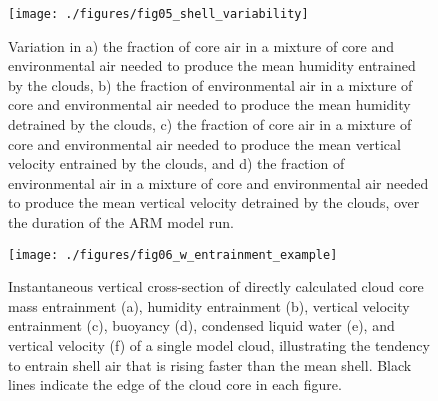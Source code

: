 \documentclass[12pt]{article}
\begin{document}
\begin{figure}[t]
  \noindent\texttt{[image: ./figures/fig05\_shell\_variability]}
  \caption{Variation in a) the fraction of core air in a mixture of core 
  and environmental air needed to produce the mean humidity entrained by 
  the clouds, b) the fraction of environmental air in a mixture of core 
  and environmental air needed to produce the mean humidity detrained by 
  the clouds, c) the fraction of core air in a mixture of core and 
  environmental air needed to produce the mean vertical velocity 
  entrained by the clouds, and d) the fraction of environmental air in 
  a mixture of core and environmental air needed to produce the mean 
  vertical velocity detrained by the clouds, over the duration of the 
  ARM model run.
  }
  \label{fig:shell_variability}
\end{figure}

\begin{figure}[t]
  \noindent\texttt{[image: ./figures/fig06\_w\_entrainment\_example]}
  \caption{Instantaneous vertical cross-section of directly calculated 
  cloud core mass entrainment (a), humidity entrainment (b), vertical 
  velocity entrainment (c), buoyancy (d), condensed liquid water (e), 
  and vertical velocity (f) of a single model cloud, illustrating the 
  tendency to entrain shell air that is rising faster than the mean 
  shell.  Black lines indicate the edge of the cloud core in each 
  figure.}
  \label{fig:w_entrainment_example}
\end{figure}
\end{document}
